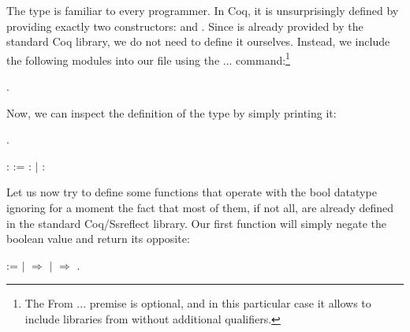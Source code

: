 The type  is familiar to every programmer. In Coq, it is
unsurprisingly defined by providing exactly two constructors: 
and . Since  is already provided by the standard Coq
library, we do not need to define it ourselves. Instead, we include
the following modules into our file using the  ... 
   command:\footnote{The
\textsf{From ...} premise is optional, and in this particular case
it allows to include libraries from  without additional qualifiers.}


\begin{coqdoccode}
\coqdocemptyline
\coqdocnoindent
{} \coqdoceol
\coqdocnoindent
{}   .\coqdoceol
\coqdocemptyline
\end{coqdoccode}
Now, we can inspect the definition of the  type by simply
printing it:  




\begin{coqdoccode}
\coqdocemptyline
\coqdocnoindent
{} .\coqdoceol
\end{coqdoccode}


\coqdoceol
\coqdocemptyline
\coqdocnoindent
{}  :  :=   :  \ensuremath{|}  : 

\coqdocemptyline




Let us now try to define some functions that operate with the bool
datatype ignoring for a moment the fact that most of them, if not all,
are already defined in the standard Coq/Ssreflect library.  Our first
function will simply negate the boolean value and return its opposite:


\begin{coqdoccode}
\coqdocemptyline
\coqdocnoindent
{}   := \coqdoceol
\coqdocindent{1.00em}
   \coqdoceol
\coqdocindent{1.00em}
\ensuremath{|}   \ensuremath{\Rightarrow} \coqdoceol
\coqdocindent{1.00em}
\ensuremath{|}  \ensuremath{\Rightarrow} \coqdoceol
\coqdocindent{1.00em}
.\coqdoceol
\coqdocemptyline
\end{coqdoccode}


